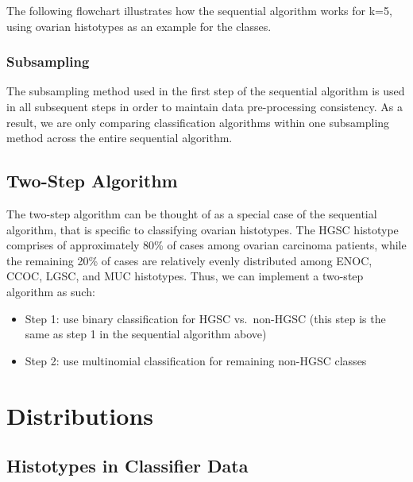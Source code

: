 \documentclass[
]{report}
\providecommand{\tightlist}{%
  \setlength{\itemsep}{0pt}\setlength{\parskip}{0pt}}
\begin{document}
The following flowchart illustrates how the sequential algorithm works for k=5, using ovarian histotypes as an example for the classes.

\hypertarget{subsampling-1}{%
\subsection{Subsampling}\label{subsampling-1}}

The subsampling method used in the first step of the sequential algorithm is used in all subsequent steps in order to maintain data pre-processing consistency. As a result, we are only comparing classification algorithms within one subsampling method across the entire sequential algorithm.

\hypertarget{two-step-algorithm}{%
\section{Two-Step Algorithm}\label{two-step-algorithm}}

The two-step algorithm can be thought of as a special case of the sequential algorithm, that is specific to classifying ovarian histotypes. The HGSC histotype comprises of approximately 80\% of cases among ovarian carcinoma patients, while the remaining 20\% of cases are relatively evenly distributed among ENOC, CCOC, LGSC, and MUC histotypes. Thus, we can implement a two-step algorithm as such:

\begin{itemize}
\tightlist
\item
  Step 1: use binary classification for HGSC vs.~non-HGSC (this step is the same as step 1 in the sequential algorithm above)
\item
  Step 2: use multinomial classification for remaining non-HGSC classes
\end{itemize}

\hypertarget{distributions}{%
\chapter{Distributions}\label{distributions}}

\hypertarget{histotypes-in-classifier-data}{%
\section{Histotypes in Classifier Data}\label{histotypes-in-classifier-data}}
\end{document}
